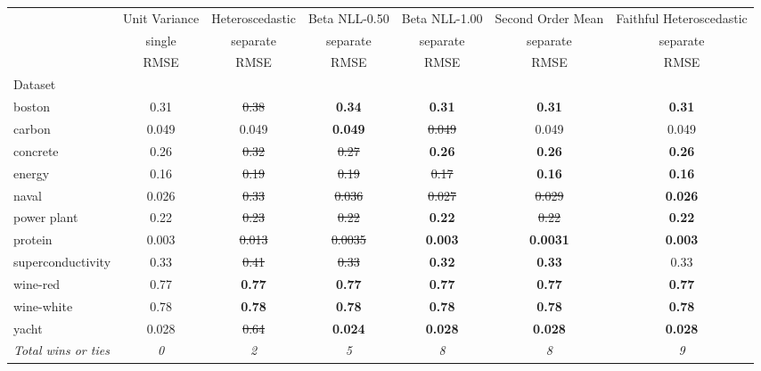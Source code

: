 \begin{tabular}{l|c|c|c|c|c|c}
\toprule
{} & {Unit Variance} & {Heteroscedastic} & {Beta NLL-0.50} & {Beta NLL-1.00} & {Second Order Mean} & {Faithful Heteroscedastic} \\
{} & {single} & {separate} & {separate} & {separate} & {separate} & {separate} \\
{} & {RMSE} & {RMSE} & {RMSE} & {RMSE} & {RMSE} & {RMSE} \\
{Dataset} & {} & {} & {} & {} & {} & {} \\
\midrule
boston & 0.31 & \sout{0.38} & \textbf{0.34} & \textbf{0.31} & \textbf{0.31} & \textbf{0.31} \\
carbon & 0.049 & 0.049 & \textbf{0.049} & \sout{0.049} & 0.049 & 0.049 \\
concrete & 0.26 & \sout{0.32} & \sout{0.27} & \textbf{0.26} & \textbf{0.26} & \textbf{0.26} \\
energy & 0.16 & \sout{0.19} & \sout{0.19} & \sout{0.17} & \textbf{0.16} & \textbf{0.16} \\
naval & 0.026 & \sout{0.33} & \sout{0.036} & \sout{0.027} & \sout{0.029} & \textbf{0.026} \\
power plant & 0.22 & \sout{0.23} & \sout{0.22} & \textbf{0.22} & \sout{0.22} & \textbf{0.22} \\
protein & 0.003 & \sout{0.013} & \sout{0.0035} & \textbf{0.003} & \textbf{0.0031} & \textbf{0.003} \\
superconductivity & 0.33 & \sout{0.41} & \sout{0.33} & \textbf{0.32} & \textbf{0.33} & 0.33 \\
wine-red & 0.77 & \textbf{0.77} & \textbf{0.77} & \textbf{0.77} & \textbf{0.77} & \textbf{0.77} \\
wine-white & 0.78 & \textbf{0.78} & \textbf{0.78} & \textbf{0.78} & \textbf{0.78} & \textbf{0.78} \\
yacht & 0.028 & \sout{0.64} & \textbf{0.024} & \textbf{0.028} & \textbf{0.028} & \textbf{0.028} \\
\textit{{Total wins or ties}} & \textit{0} & \textit{2} & \textit{5} & \textit{8} & \textit{8} & \textit{9} \\
\bottomrule
\end{tabular}
